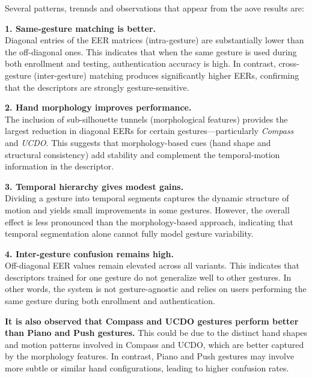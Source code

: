 \noindent
Several patterns, trennds and observations that appear from the aove results are:

\vspace{4pt}
\noindent
\textbf{1. Same-gesture matching is better.} \\
Diagonal entries of the EER matrices (intra-gesture) are substantially lower than the off-diagonal ones. 
This indicates that when the same gesture is used during both enrollment and testing, authentication accuracy is high. 
In contrast, cross-gesture (inter-gesture) matching produces significantly higher EERs, confirming that the descriptors are strongly gesture-sensitive.

\vspace{4pt}
\noindent
\textbf{2. Hand morphology improves performance.} \\
The inclusion of sub-silhouette tunnels (morphological features) provides the largest reduction in diagonal EERs for certain gestures—particularly \textit{Compass} and \textit{UCDO}. 
This suggests that morphology-based cues (hand shape and structural consistency) add stability and complement the temporal-motion information in the descriptor.

\vspace{4pt}
\noindent
\textbf{3. Temporal hierarchy gives modest gains.} \\
Dividing a gesture into temporal segments captures the dynamic structure of motion and yields small improvements in some gestures. 
However, the overall effect is less pronounced than the morphology-based approach, indicating that temporal segmentation alone cannot fully model gesture variability.

\vspace{4pt}
\noindent
\textbf{4. Inter-gesture confusion remains high.} \\
Off-diagonal EER values remain elevated across all variants. 
This indicates that descriptors trained for one gesture do not generalize well to other gestures. 
In other words, the system is not gesture-agnostic and relies on users performing the same gesture during both enrollment and authentication.


\textbf{It is also observed that Compass and UCDO gestures perform better than Piano and Push gestures.} This could be due to the distinct hand shapes and motion patterns involved in Compass and UCDO, which are better captured by the morphology features. In contrast, Piano and Push gestures may involve more subtle or similar hand configurations, leading to higher confusion rates. \\


